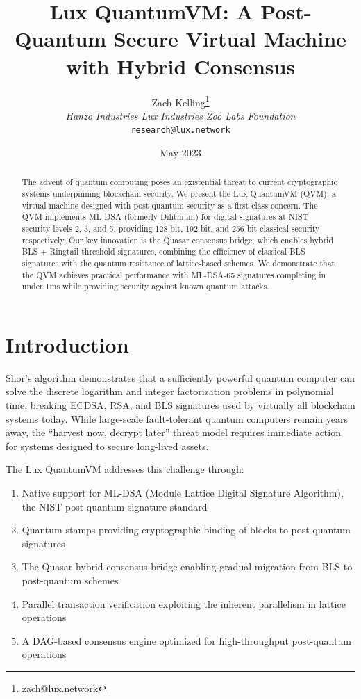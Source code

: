 \documentclass[11pt,a4paper]{article}
\title{\textbf{Lux QuantumVM: A Post-Quantum Secure Virtual Machine with Hybrid Consensus}}
\author{Zach Kelling\thanks{zach@lux.network} \\ \textit{Hanzo Industries \quad Lux Industries \quad Zoo Labs Foundation} \\ \texttt{research@lux.network}}
\date{May 2023}
\begin{document}
\maketitle

\begin{abstract}
The advent of quantum computing poses an existential threat to current cryptographic systems underpinning blockchain security. We present the Lux QuantumVM (QVM), a virtual machine designed with post-quantum security as a first-class concern. The QVM implements ML-DSA (formerly Dilithium) for digital signatures at NIST security levels 2, 3, and 5, providing 128-bit, 192-bit, and 256-bit classical security respectively. Our key innovation is the Quasar consensus bridge, which enables hybrid BLS + Ringtail threshold signatures, combining the efficiency of classical BLS signatures with the quantum resistance of lattice-based schemes. We demonstrate that the QVM achieves practical performance with ML-DSA-65 signatures completing in under 1ms while providing security against known quantum attacks.
\end{abstract}

\section{Introduction}

Shor's algorithm demonstrates that a sufficiently powerful quantum computer can solve the discrete logarithm and integer factorization problems in polynomial time, breaking ECDSA, RSA, and BLS signatures used by virtually all blockchain systems today. While large-scale fault-tolerant quantum computers remain years away, the ``harvest now, decrypt later'' threat model requires immediate action for systems designed to secure long-lived assets.

The Lux QuantumVM addresses this challenge through:

\begin{enumerate}
    \item Native support for ML-DSA (Module Lattice Digital Signature Algorithm), the NIST post-quantum signature standard
    \item Quantum stamps providing cryptographic binding of blocks to post-quantum signatures
    \item The Quasar hybrid consensus bridge enabling gradual migration from BLS to post-quantum schemes
    \item Parallel transaction verification exploiting the inherent parallelism in lattice operations
    \item A DAG-based consensus engine optimized for high-throughput post-quantum operations
\end{enumerate}
\end{document}
